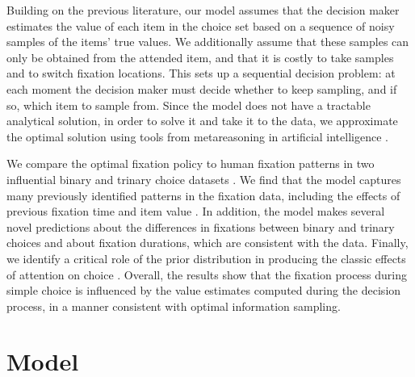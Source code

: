 Building on the previous literature, our model assumes that the decision maker estimates the value of each item in the choice set based on a sequence of noisy samples of the items' true values. We additionally assume that these samples can only be obtained from the attended item, and that it is costly to take samples and to switch fixation locations. This sets up a sequential decision problem: at each moment the decision maker must decide whether to keep sampling, and if so, which item to sample from. Since the model does not have a tractable analytical solution, in order to solve it and take it to the data, we approximate the optimal solution using tools from metareasoning in artificial intelligence \citep{matheson1968economic,russell1991principles,hay2012selecting,callaway2018learning}.

We compare the optimal fixation policy to human fixation patterns in two influential binary and trinary choice datasets \citep{krajbich2010visual,krajbich2011multialternative}. We find that the model captures many previously identified patterns in the fixation data, including the effects of previous fixation time \citep{song2019proactive} and item value \citep{gluth2018valuebaseda,gluth2020valuebased,sepulveda2020visual}. In addition, the model makes several novel predictions about the differences in fixations between binary and trinary choices and about fixation durations, which are consistent with the data. Finally, we identify a critical role of the prior distribution in producing the classic effects of attention on choice \citep{armel2008neuroeconomic,armel2008biasing,krajbich2010visual,krajbich2011multialternative}. Overall, the results show that the fixation process during simple choice is influenced by the value estimates computed during the decision process, in a manner consistent with optimal information sampling.


\section{Model}


